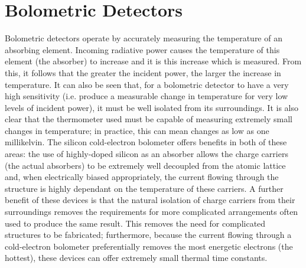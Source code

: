 \section{Bolometric Detectors}\label{sec:bolometers}
Bolometric detectors operate by accurately measuring the temperature of an absorbing element. Incoming radiative power causes the temperature of this element (the absorber) to increase and it is this increase which is measured. From this, it follows that the greater the incident power, the larger the increase in temperature. It can also be seen that, for a bolometric detector to have a very high sensitivity (i.e. produce a measurable change in temperature for very low levels of incident power), it must be well isolated from its surroundings. It is also clear that the thermometer used must be capable of measuring extremely small changes in temperature;  in practice, this can mean changes as low as one millikelvin. The silicon cold-electron bolometer offers benefits in both of these areas: the use of highly-doped silicon as an absorber allows the charge carriers (the actual absorbers) to be extremely well decoupled from the atomic lattice and, when electrically biased appropriately, the current flowing through the structure is highly dependant on the temperature of these carriers. A further benefit of these devices is that the natural isolation of charge carriers from their surroundings removes the requirements for more complicated arrangements often used to produce the same result. This removes the need for complicated structures to be fabricated; furthermore, because the current flowing through a cold-electron bolometer preferentially removes the most energetic electrons (the hottest), these devices can offer extremely small thermal time constants.

